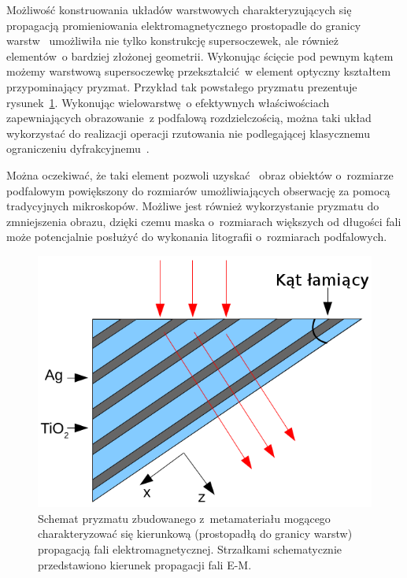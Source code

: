Możliwość konstruowania układów warstwowych charakteryzujących się propagacją promieniowania elektromagnetycznego prostopadle do granicy warstw~\cite{wood2006directed,quan2006refraction,kotynski2011sub} umożliwiła nie tylko konstrukcję supersoczewek, ale również elementów~o bardziej złożonej geometrii. Wykonując ścięcie pod pewnym kątem możemy warstwową supersoczewkę przekształcić~w element optyczny kształtem przypominający pryzmat. Przykład tak powstałego pryzmatu prezentuje rysunek~\ref{fig:prism-schema}. Wykonując wielowarstwę~o efektywnych właściwościach zapewniających obrazowanie~z podfalową rozdzielczością, można taki układ wykorzystać do realizacji operacji rzutowania nie podlegającej klasycznemu ograniczeniu dyfrakcyjnemu~\cite{prism2010}. 

Można oczekiwać, że taki element pozwoli uzyskać~ obraz obiektów o~rozmiarze podfalowym powiększony do rozmiarów umożliwiających obserwację za pomocą tradycyjnych mikroskopów. Możliwe jest również wykorzystanie pryzmatu do zmniejszenia obrazu, dzięki czemu maska o~rozmiarach większych od długości fali może potencjalnie posłużyć do wykonania litografii o~rozmiarach podfalowych.

			\begin{figure}[tbH]
				\includegraphics[width=\textwidth]{images/multilayer/prism.png}
				\caption{Schemat pryzmatu zbudowanego z~metamateriału mogącego charakteryzować się kierunkową (prostopadłą do granicy warstw) propagacją fali elektromagnetycznej. Strzałkami schematycznie przedstawiono kierunek propagacji fali E-M.}
				\label{fig:prism-schema}
			\end{figure}



